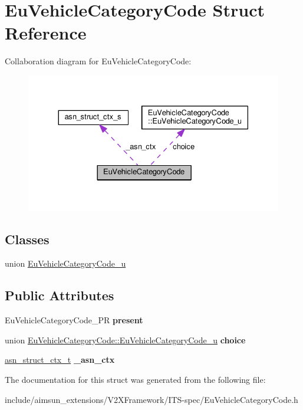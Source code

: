 \hypertarget{structEuVehicleCategoryCode}{}\section{Eu\+Vehicle\+Category\+Code Struct Reference}
\label{structEuVehicleCategoryCode}


Collaboration diagram for Eu\+Vehicle\+Category\+Code\+:\nopagebreak
\begin{figure}[H]
\begin{center}
\leavevmode
\includegraphics[width=330pt]{structEuVehicleCategoryCode__coll__graph}
\end{center}
\end{figure}
\subsection*{Classes}
\begin{DoxyCompactItemize}
\item 
union \hyperlink{unionEuVehicleCategoryCode_1_1EuVehicleCategoryCode__u}{Eu\+Vehicle\+Category\+Code\+\_\+u}
\end{DoxyCompactItemize}
\subsection*{Public Attributes}
\begin{DoxyCompactItemize}
\item 
Eu\+Vehicle\+Category\+Code\+\_\+\+PR {\bfseries present}\hypertarget{structEuVehicleCategoryCode_a6d3a6d25dee58603acedf07aa7deb1f4}{}\label{structEuVehicleCategoryCode_a6d3a6d25dee58603acedf07aa7deb1f4}

\item 
union \hyperlink{unionEuVehicleCategoryCode_1_1EuVehicleCategoryCode__u}{Eu\+Vehicle\+Category\+Code\+::\+Eu\+Vehicle\+Category\+Code\+\_\+u} {\bfseries choice}\hypertarget{structEuVehicleCategoryCode_adfc4433500711976be53d4f3372346d9}{}\label{structEuVehicleCategoryCode_adfc4433500711976be53d4f3372346d9}

\item 
\hyperlink{structasn__struct__ctx__s}{asn\+\_\+struct\+\_\+ctx\+\_\+t} {\bfseries \+\_\+asn\+\_\+ctx}\hypertarget{structEuVehicleCategoryCode_a871141fd4e41d1c83211a5ed278e1f78}{}\label{structEuVehicleCategoryCode_a871141fd4e41d1c83211a5ed278e1f78}

\end{DoxyCompactItemize}


The documentation for this struct was generated from the following file\+:\begin{DoxyCompactItemize}
\item 
include/aimsun\+\_\+extensions/\+V2\+X\+Framework/\+I\+T\+S-\/spec/Eu\+Vehicle\+Category\+Code.\+h\end{DoxyCompactItemize}

